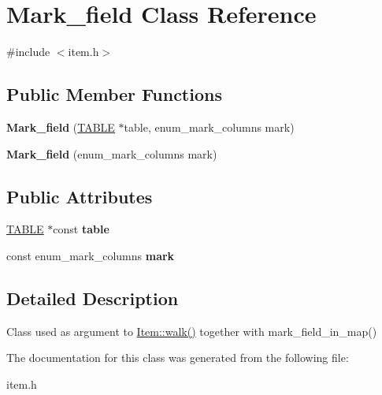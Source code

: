 \hypertarget{classMark__field}{}\section{Mark\+\_\+field Class Reference}
\label{classMark__field}


{\ttfamily \#include $<$item.\+h$>$}

\subsection*{Public Member Functions}
\begin{DoxyCompactItemize}
\item 
\mbox{\label{classMark__field_a20f6701cddbeceb3e1d790618f2f555a}} 
{\bfseries Mark\+\_\+field} (\mbox{\hyperlink{structTABLE}{T\+A\+B\+LE}} $\ast$table, enum\+\_\+mark\+\_\+columns mark)
\item 
\mbox{\label{classMark__field_a8600ef1b953a619181ce1d53fd6c9d3f}} 
{\bfseries Mark\+\_\+field} (enum\+\_\+mark\+\_\+columns mark)
\end{DoxyCompactItemize}
\subsection*{Public Attributes}
\begin{DoxyCompactItemize}
\item 
\mbox{\label{classMark__field_ac9dbf0433454ee7041219625af07092b}} 
\mbox{\hyperlink{structTABLE}{T\+A\+B\+LE}} $\ast$const {\bfseries table}
\item 
\mbox{\label{classMark__field_af6c0ed6ed7952878deac01bd6801b3b7}} 
const enum\+\_\+mark\+\_\+columns {\bfseries mark}
\end{DoxyCompactItemize}


\subsection{Detailed Description}
Class used as argument to \mbox{\hyperlink{classItem_ab7d2529511c14a77e59a1b1bbabc95d7}{Item\+::walk()}} together with mark\+\_\+field\+\_\+in\+\_\+map() 

The documentation for this class was generated from the following file\+:\begin{DoxyCompactItemize}
\item 
item.\+h\end{DoxyCompactItemize}

